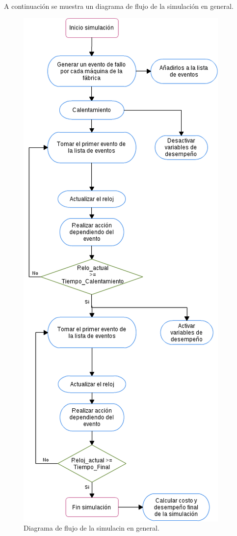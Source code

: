 \documentclass[12pt]{article}
\begin{document}
A continuación se muestra un diagrama de flujo de la simulación en general.\\

\begin{figure}
  \centering
    \includegraphics[scale=0.6]{Simulacion_flujo.png}
  \caption{Diagrama de flujo de la simulacin en general.}
  \label{fig:simulacion}
\end{figure}
\end{document}
